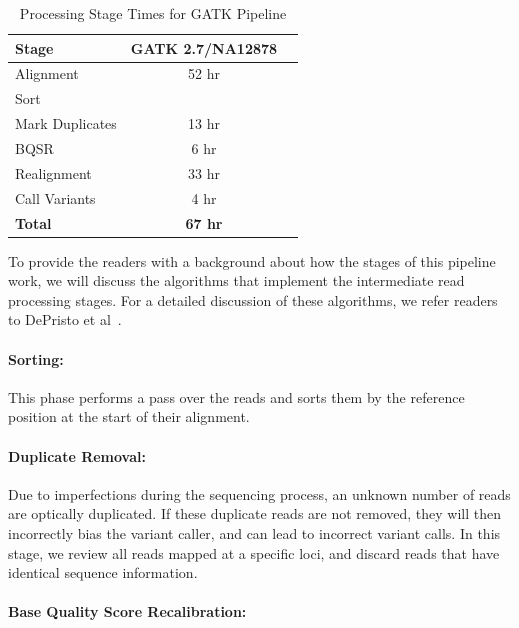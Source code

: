 \documentclass[10pt,twocolumn]{article}
\begin{document}
\begin{table}[h]
\caption{Processing Stage Times for GATK Pipeline}
\label{tab:stage-time}
\begin{center}
\begin{tabular}{| l | c | c |}
\hline
\bf Stage & \bf GATK 2.7/NA12878 \\
\hline
Alignment & 52 hr \\
Sort & \\
Mark Duplicates & 13 hr \\
BQSR & 6 hr \\
Realignment & 33 hr \\
Call Variants & 4 hr \\
\bf Total & \bf 67 hr \\
\hline
\end{tabular}
\end{center}
\end{table}

To provide the readers with a background about how the stages of this pipeline work, we will discuss the algorithms that
implement the intermediate read processing stages. For a detailed discussion of these algorithms, we refer readers to DePristo
et al~\cite{depristo11}.

\paragraph{Sorting:}
\label{sec:sorting}

This phase performs a pass over the reads and sorts them by the reference position at the start of their alignment.

\paragraph{Duplicate Removal:} 
\label{sec:duplicate-removal}

Due to imperfections during the sequencing process, an unknown number of reads are optically duplicated. If these duplicate
reads are not removed, they will then incorrectly bias the variant caller, and can lead to incorrect variant calls. In this stage, we
review all reads mapped at a specific loci, and discard reads that have identical sequence information.

\paragraph{Base Quality Score Recalibration:} 
\label{sec:bqsr}
\end{document}
